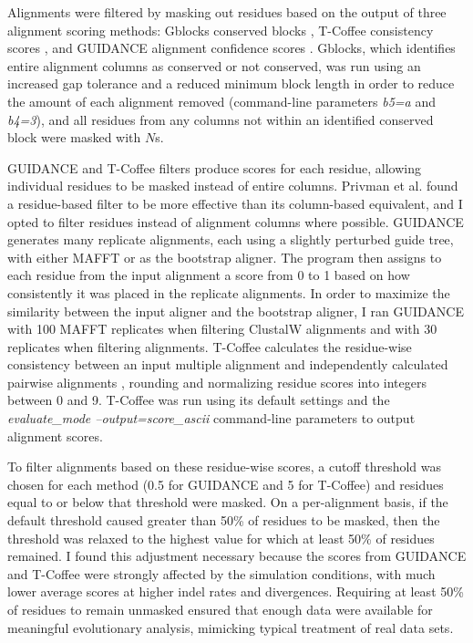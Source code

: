 Alignments were filtered by masking out residues based on the output
of three alignment scoring methods: Gblocks conserved blocks
\citep{Castresana2000Selection}, T-Coffee consistency scores
\citep{Notredame2000TCoffee,Notredame2003Using}, and GUIDANCE
alignment confidence scores \citep{Penn2010Alignment}. Gblocks, which
identifies entire alignment columns as conserved or not conserved, was
run using an increased gap tolerance and a reduced minimum block
length in order to reduce the amount of each alignment removed
(command-line parameters {\em b5=a} and {\em b4=3}), and all residues
from any columns not within an identified conserved block were masked
with $N$s.

GUIDANCE and T-Coffee filters produce scores for each residue,
allowing individual residues to be masked instead of entire
columns. Privman et al. \citeyearpar{Privman2011Improving} found a
residue-based filter to be more effective than its column-based
equivalent, and I opted to filter residues instead of alignment
columns where possible. GUIDANCE generates many replicate alignments,
each using a slightly perturbed guide tree, with either MAFFT or
\pranka as the bootstrap aligner. The program then assigns to each
residue from the input alignment a score from 0 to 1 based on how
consistently it was placed in the replicate alignments. In order to
maximize the similarity between the input aligner and the bootstrap
aligner, I ran GUIDANCE with 100 MAFFT replicates when filtering
ClustalW alignments and with 30 \pranka replicates when filtering
\prankc alignments. T-Coffee calculates the residue-wise consistency
between an input multiple alignment and independently calculated
pairwise alignments \citep{Notredame2003Using}, rounding and
normalizing residue scores into integers between 0 and 9. T-Coffee was
run using its default settings and the {\em evaluate\_mode
  --output=score\_ascii} command-line parameters to output alignment
scores.

To filter alignments based on these residue-wise scores, a cutoff
threshold was chosen for each method (0.5 for GUIDANCE and 5 for
T-Coffee) and residues equal to or below that threshold were
masked. On a per-alignment basis, if the default threshold caused
greater than 50\% of residues to be masked, then the threshold was
relaxed to the highest value for which at least 50\% of residues
remained. I found this adjustment necessary because the scores from
GUIDANCE and T-Coffee were strongly affected by the simulation
conditions, with much lower average scores at higher indel rates and
divergences. Requiring at least 50\% of residues to remain unmasked
ensured that enough data were available for meaningful evolutionary
analysis, mimicking typical treatment of real data sets.

